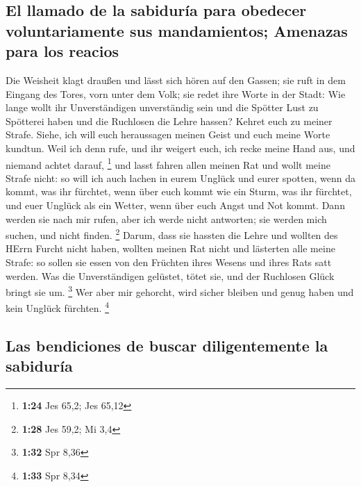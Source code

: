 \hypertarget{el-llamado-de-la-sabiduruxeda-para-obedecer-voluntariamente-sus-mandamientos-amenazas-para-los-reacios}{%
\subsection{El llamado de la sabiduría para obedecer voluntariamente sus
mandamientos; Amenazas para los
reacios}\label{el-llamado-de-la-sabiduruxeda-para-obedecer-voluntariamente-sus-mandamientos-amenazas-para-los-reacios}}

 Die Weisheit klagt draußen und lässt sich hören auf den
Gassen;  sie ruft in dem Eingang des Tores, vorn unter
dem Volk; sie redet ihre Worte in der Stadt:  Wie lange
wollt ihr Unverständigen unverständig sein und die Spötter Lust zu
Spötterei haben und die Ruchlosen die Lehre hassen? 
Kehret euch zu meiner Strafe. Siehe, ich will euch heraussagen meinen
Geist und euch meine Worte kundtun.  Weil ich denn rufe,
und ihr weigert euch, ich recke meine Hand aus, und niemand achtet
darauf, \footnote{\textbf{1:24} Jes 65,2; Jes 65,12}  und
lasst fahren allen meinen Rat und wollt meine Strafe nicht:
 so will ich auch lachen in eurem Unglück und eurer
spotten, wenn da kommt, was ihr fürchtet,  wenn über euch
kommt wie ein Sturm, was ihr fürchtet, und euer Unglück als ein Wetter,
wenn über euch Angst und Not kommt.  Dann werden sie nach
mir rufen, aber ich werde nicht antworten; sie werden mich suchen, und
nicht finden. \footnote{\textbf{1:28} Jes 59,2; Mi 3,4} 
Darum, dass sie hassten die Lehre und wollten des HErrn Furcht nicht
haben,  wollten meinen Rat nicht und lästerten alle meine
Strafe:  so sollen sie essen von den Früchten ihres
Wesens und ihres Rats satt werden.  Was die
Unverständigen gelüstet, tötet sie, und der Ruchlosen Glück bringt sie
um. \footnote{\textbf{1:32} Spr 8,36}  Wer aber mir
gehorcht, wird sicher bleiben und genug haben und kein Unglück fürchten.
\footnote{\textbf{1:33} Spr 8,34}

\hypertarget{las-bendiciones-de-buscar-diligentemente-la-sabiduruxeda}{%
\subsection{Las bendiciones de buscar diligentemente la
sabiduría}\label{las-bendiciones-de-buscar-diligentemente-la-sabiduruxeda}}

